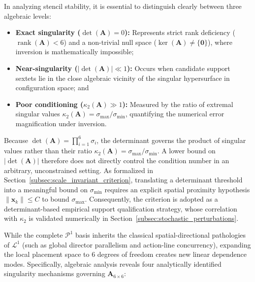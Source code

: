 \documentclass[preprint,12pt]{elsarticle}
\begin{document}
In analyzing stencil stability, it is essential to distinguish clearly between three algebraic levels:
\begin{itemize}
    \item \textbf{Exact singularity ($\det(\mathbf{A}) = 0$):} Represents strict rank deficiency ($\operatorname{rank}(\mathbf{A}) < 6$) and a non-trivial null space ($\ker(\mathbf{A}) \neq \{\mathbf{0}\}$), where inversion is mathematically impossible;
    \item \textbf{Near-singularity ($|\det(\mathbf{A})| \ll 1$):} Occurs when candidate support sextets lie in the close algebraic vicinity of the singular hypersurface in configuration space; and
    \item \textbf{Poor conditioning ($\kappa_2(\mathbf{A}) \gg 1$):} Measured by the ratio of extremal singular values $\kappa_2(\mathbf{A}) = \sigma_{\max} / \sigma_{\min}$, quantifying the numerical error magnification under inversion.
\end{itemize}
Because $\det(\mathbf{A}) = \prod_{i=1}^6 \sigma_i$, the determinant governs the product of singular values rather than their ratio $\kappa_2(\mathbf{A}) = \sigma_{\max} / \sigma_{\min}$. A lower bound on $|\det(\mathbf{A})|$ therefore does not directly control the condition number in an arbitrary, unconstrained setting. As formalized in Section~\ref{subsec:scale_invariant_criterion}, translating a determinant threshold into a meaningful bound on $\sigma_{\min}$ requires an explicit spatial proximity hypothesis $\|\hat{\mathbf{x}}_k\| \le C$ to bound $\sigma_{\max}$. Consequently, the criterion is adopted as a determinant-based empirical support qualification strategy, whose correlation with $\kappa_2$ is validated numerically in Section~\ref{subsec:stochastic_perturbations}.

While the complete $\mathcal{P}^1$ basis inherits the classical spatial-directional pathologies of $\mathcal{L}^1$ (such as global director parallelism and action-line concurrency), expanding the local placement space to 6 degrees of freedom creates new linear dependence modes. Specifically, algebraic analysis reveals four analytically identified singularity mechanisms governing $\mathbf{A}_{6 \times 6}$:
\end{document}
